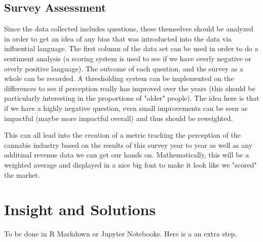 \documentclass[12pt,a4paper]{book}
\begin{document}
\subsection{Survey Assessment}
Since the data collected includes questions, these themselves should be analyzed in order to get an idea of any bias that was introducted into the data via influential language. The first column of the data set can be used in order to do a sentiment analysis (a scoring system is used to see if we have overly negative or overly positive language). The outcome of each question, and the survey as a whole can be recorded. A thresholding system can be implemented on the differences to see if perception really has improved over the years (this should be particularly interesting in the proportions of "older" people). The idea here is that if we have a highly negative question, even small improvements can be seen as impactful (maybe more impactful overall) and thus should be reweighted. 

This can all lead into the creation of a metric tracking the perception of the cannabis industry based on the results of this survey year to year as well as any additinal revenue data we can get our hands on. Mathematically, this will be a weighted average and displayed in a nice big font to make it look like we "scored" the market. 

\section{Insight and Solutions}
To be done in R Markdown or Jupyter Notebooks. Here is a an extra step.
\end{document}

